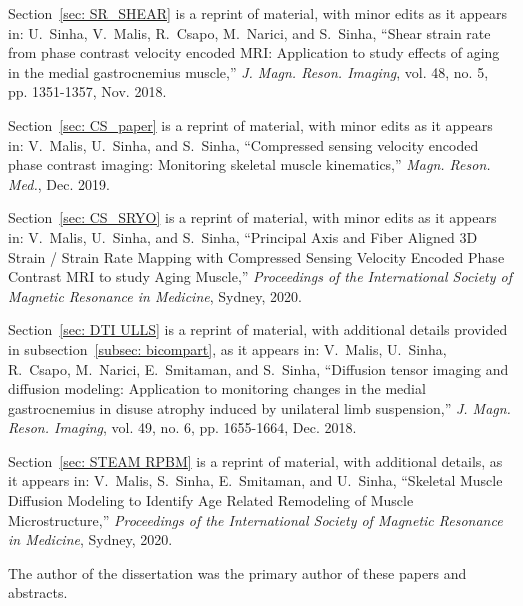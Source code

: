 \begin{frontmatter}
\begin{acknowledgements}
Section~\ref{sec: SR_SHEAR} is a reprint of material, with minor edits as it appears in: U.~Sinha, V.~Malis, R.~Csapo, M.~Narici, and S.~Sinha, ``Shear strain rate from phase contrast velocity encoded MRI: Application to study effects of aging in the medial gastrocnemius muscle,'' \emph{J. Magn. Reson. Imaging}, vol. 48, no. 5, pp. 1351-1357, Nov. 2018.

Section~\ref{sec: CS_paper} is a reprint of material, with minor edits as it appears in: V.~Malis, U.~Sinha, and S.~Sinha, ``Compressed sensing velocity encoded phase contrast imaging: Monitoring skeletal muscle kinematics,'' \emph{Magn. Reson. Med.}, Dec. 2019.

Section~\ref{sec: CS_SRYO} is a reprint of material, with minor edits as it appears in: V.~Malis, U.~Sinha, and S.~Sinha, ``Principal Axis and Fiber Aligned 3D Strain / Strain Rate Mapping with Compressed Sensing Velocity Encoded Phase Contrast MRI to study Aging Muscle,'' \emph{Proceedings of the International Society of Magnetic Resonance in Medicine}, Sydney, 2020.

Section~\ref{sec: DTI ULLS} is a reprint of material, with additional details provided in subsection~\ref{subsec: bicompart}, as it appears in: V.~Malis, U.~Sinha, R.~Csapo, M.~Narici, E.~Smitaman, and S.~Sinha, ``Diffusion tensor imaging and diffusion modeling: Application to monitoring changes in the medial gastrocnemius in disuse atrophy induced by unilateral limb suspension,'' \emph{J. Magn. Reson. Imaging}, vol. 49, no. 6, pp. 1655-1664, Dec. 2018.

Section~\ref{sec: STEAM RPBM} is a reprint of material, with additional details, as it appears in: V.~Malis, S.~Sinha, E.~Smitaman, and U.~Sinha, ``Skeletal Muscle Diffusion Modeling to Identify Age Related Remodeling of Muscle Microstructure,'' \emph{Proceedings of the International Society of Magnetic Resonance in Medicine}, Sydney, 2020.

The author of the dissertation was the primary author of these papers and abstracts.
\end{acknowledgements}



\end{frontmatter}
